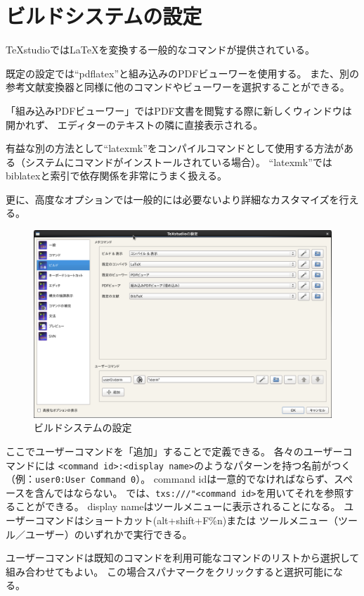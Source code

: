 \section{ビルドシステムの設定}

TeXstudioではLaTeXを変換する一般的なコマンドが提供されている。

既定の設定では``pdflatex''と組み込みのPDFビューワーを使用する。
また、別の参考文献変換器と同様に他のコマンドやビューワーを選択することができる。

「組み込みPDFビューワー」ではPDF文書を閲覧する際に新しくウィンドウは開かれず、
エディターのテキストの隣に直接表示される。

有益な別の方法として``latexmk''をコンパイルコマンドとして使用する方法がある（システムにコマンドがインストールされている場合）。
``latexmk''ではbiblatexと索引で依存関係を非常にうまく扱える。

更に、高度なオプションでは一般的には必要ないより詳細なカスタマイズを行える。

\begin{figure}[H]
  \centering
  \includegraphics[width=.8\linewidth]{configure_build.png}
  \caption{ビルドシステムの設定}
\end{figure}

ここでユーザーコマンドを「追加」することで定義できる。
各々のユーザーコマンドには
\verb+<command id>:<display name>+のようなパターンを持つ名前がつく
（例：\verb+user0:User Command 0+）。
command idは一意的でなければならず、スペースを含んではならない。
では、\verb+txs:///"<command id>+を用いてそれを参照することができる。
display nameはツールメニューに表示されることになる。
ユーザーコマンドはショートカット(alt+shift+F\%n)または
ツールメニュー（ツール／ユーザー）のいずれかで実行できる。

ユーザーコマンドは既知のコマンドを利用可能なコマンドのリストから選択して組み合わせてもよい。
この場合スパナマークをクリックすると選択可能になる。


